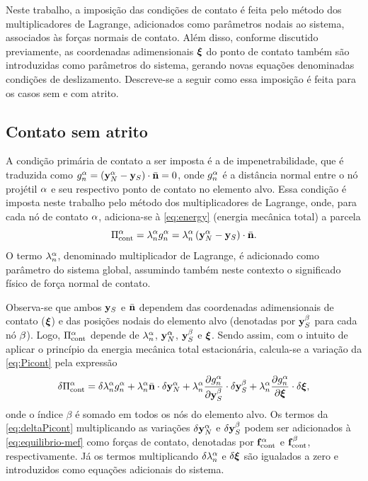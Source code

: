 \documentclass[Tese.tex]{subfiles}
\begin{document}
Neste trabalho, a imposição das condições de contato é feita pelo método dos multiplicadores de Lagrange, adicionados como parâmetros nodais ao sistema, associados às forças normais de contato. Além disso, conforme discutido previamente, as coordenadas adimensionais $\boldsymbol{\xi}$ do ponto de contato também são introduzidas como parâmetros do sistema, gerando novas equações denominadas condições de deslizamento. Descreve-se a seguir como essa imposição é feita para os casos sem e com atrito.

\subsection{Contato sem atrito}\label{subsec:sematrito}

A condição primária de contato a ser imposta é a de impenetrabilidade, que é traduzida como $g_n^\alpha=\left(\mathbf{y}_N^\alpha-\mathbf{y}_S\right)\cdot\bar{\mathbf{n}}=0$, onde $g_n^\alpha$ é a distância normal entre o nó projétil $\alpha$ e seu respectivo ponto de contato no elemento alvo. Essa condição é imposta neste trabalho pelo método dos multiplicadores de Lagrange, onde, para cada nó de contato $\alpha$, adiciona-se à \cref{eq:energy} (energia mecânica total) a parcela
\begin{equation}\label{eq:Picont}
\Pi_\text{cont}^\alpha = \lambda_n^\alpha g_n^\alpha = \lambda_n^\alpha \left(\mathbf{y}_N^\alpha-\mathbf{y}_S\right)\cdot\bar{\mathbf{n}}.
\end{equation}
O termo $\lambda_n^\alpha$, denominado multiplicador de Lagrange, é adicionado como parâmetro do sistema global, assumindo também neste contexto o significado físico de força normal de contato. 

Observa-se que ambos $\mathbf{y}_S$ e $\bar{\mathbf{n}}$ dependem das coordenadas adimensionais de contato ($\boldsymbol{\xi}$) e das posições nodais do elemento alvo (denotadas por $\mathbf{y}_S^\beta$ para cada nó $\beta$). Logo, $\Pi_\text{cont}^\alpha$ depende de $\lambda_n^\alpha$, $\mathbf{y}_N^\alpha$, $\mathbf{y}_S^\beta$ e $\boldsymbol{\xi}$. Sendo assim, com o intuito de aplicar o princípio da energia mecânica total estacionária, calcula-se a variação da \cref{eq:Picont} pela expressão
\begin{equation}\label{eq:deltaPicont}
\delta\Pi_\text{cont}^\alpha =\delta\lambda_n^\alpha g_n^\alpha + \lambda_n^\alpha\bar{\mathbf{n}} \cdot \delta\mathbf{y}_N^\alpha + \lambda_n^\alpha\dfrac{\partial g_n^\alpha}{\partial \mathbf{y}_S^\beta}\cdot \delta\mathbf{y}_S^\beta + \lambda_n^\alpha\dfrac{\partial g_n^\alpha}{\partial \boldsymbol{\xi}}\cdot \delta\boldsymbol{\xi},
\end{equation}
onde o índice $\beta$ é somado em todos os nós do elemento alvo. Os termos da \cref{eq:deltaPicont} multiplicando as variações $\delta\mathbf{y}_N^\alpha$ e $\delta\mathbf{y}_S^\beta$ podem ser adicionados à \cref{eq:equilibrio-mef} como forças de contato, denotadas por $\mathbf{f}_\text{cont}^\alpha$ e $\mathbf{f}_\text{cont}^\beta$, respectivamente. Já os termos multiplicando $\delta\lambda_n^\alpha$ e $\delta\boldsymbol{\xi}$ são igualados a zero e introduzidos como equações adicionais do sistema.
\end{document}

